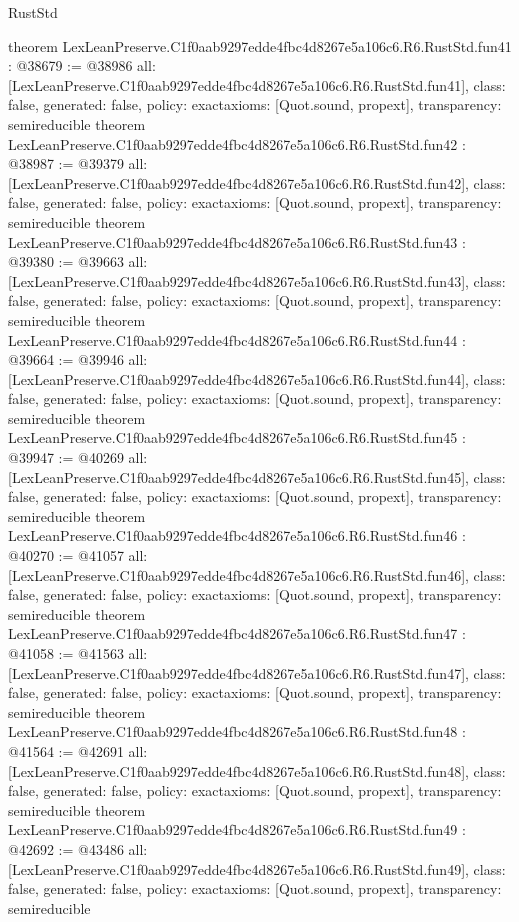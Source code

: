 \begin{lexlean}{RustStd}
\begin{coremodule}
{}
theorem LexLeanPreserve.C1f0aab9297edde4fbc4d8267e5a106c6.R6.RustStd.fun41 : @38679 := @38986 {
  all: [LexLeanPreserve.C1f0aab9297edde4fbc4d8267e5a106c6.R6.RustStd.fun41],
  class: false,
  generated: false,
  policy: exact{axioms: [Quot.sound, propext]},
  transparency: semireducible
}
theorem LexLeanPreserve.C1f0aab9297edde4fbc4d8267e5a106c6.R6.RustStd.fun42 : @38987 := @39379 {
  all: [LexLeanPreserve.C1f0aab9297edde4fbc4d8267e5a106c6.R6.RustStd.fun42],
  class: false,
  generated: false,
  policy: exact{axioms: [Quot.sound, propext]},
  transparency: semireducible
}
theorem LexLeanPreserve.C1f0aab9297edde4fbc4d8267e5a106c6.R6.RustStd.fun43 : @39380 := @39663 {
  all: [LexLeanPreserve.C1f0aab9297edde4fbc4d8267e5a106c6.R6.RustStd.fun43],
  class: false,
  generated: false,
  policy: exact{axioms: [Quot.sound, propext]},
  transparency: semireducible
}
theorem LexLeanPreserve.C1f0aab9297edde4fbc4d8267e5a106c6.R6.RustStd.fun44 : @39664 := @39946 {
  all: [LexLeanPreserve.C1f0aab9297edde4fbc4d8267e5a106c6.R6.RustStd.fun44],
  class: false,
  generated: false,
  policy: exact{axioms: [Quot.sound, propext]},
  transparency: semireducible
}
theorem LexLeanPreserve.C1f0aab9297edde4fbc4d8267e5a106c6.R6.RustStd.fun45 : @39947 := @40269 {
  all: [LexLeanPreserve.C1f0aab9297edde4fbc4d8267e5a106c6.R6.RustStd.fun45],
  class: false,
  generated: false,
  policy: exact{axioms: [Quot.sound, propext]},
  transparency: semireducible
}
theorem LexLeanPreserve.C1f0aab9297edde4fbc4d8267e5a106c6.R6.RustStd.fun46 : @40270 := @41057 {
  all: [LexLeanPreserve.C1f0aab9297edde4fbc4d8267e5a106c6.R6.RustStd.fun46],
  class: false,
  generated: false,
  policy: exact{axioms: [Quot.sound, propext]},
  transparency: semireducible
}
theorem LexLeanPreserve.C1f0aab9297edde4fbc4d8267e5a106c6.R6.RustStd.fun47 : @41058 := @41563 {
  all: [LexLeanPreserve.C1f0aab9297edde4fbc4d8267e5a106c6.R6.RustStd.fun47],
  class: false,
  generated: false,
  policy: exact{axioms: [Quot.sound, propext]},
  transparency: semireducible
}
theorem LexLeanPreserve.C1f0aab9297edde4fbc4d8267e5a106c6.R6.RustStd.fun48 : @41564 := @42691 {
  all: [LexLeanPreserve.C1f0aab9297edde4fbc4d8267e5a106c6.R6.RustStd.fun48],
  class: false,
  generated: false,
  policy: exact{axioms: [Quot.sound, propext]},
  transparency: semireducible
}
theorem LexLeanPreserve.C1f0aab9297edde4fbc4d8267e5a106c6.R6.RustStd.fun49 : @42692 := @43486 {
  all: [LexLeanPreserve.C1f0aab9297edde4fbc4d8267e5a106c6.R6.RustStd.fun49],
  class: false,
  generated: false,
  policy: exact{axioms: [Quot.sound, propext]},
  transparency: semireducible
}
\end{coremodule}
\end{lexlean}
